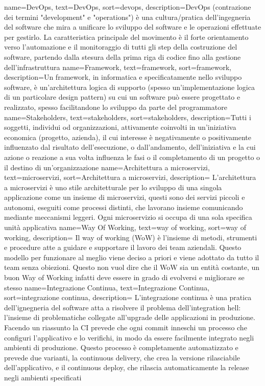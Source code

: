 {
	name=DevOps,
	text=DevOps,
	sort=devops,
	description={DevOps (contrazione dei termini "development" e "operations") è una cultura/pratica dell'ingegneria del software che mira a unificare lo sviluppo del software e le operazioni effettuate per gestirlo. La caratteristica principale del movimento è il forte orientamento verso l'automazione e il monitoraggio di tutti gli step della costruzione del software, partendo dalla stesura della prima riga di codice fino alla gestione dell'infrastruttura}
}
{
	name=Framework,
	text=framework,
	sort=framework,
	description={Un framework, in informatica e specificatamente nello sviluppo software, è un'architettura logica di supporto (spesso un'implementazione logica di un particolare design pattern) su cui un software può essere progettato e realizzato, spesso facilitandone lo sviluppo da parte del programmatore}
}
{
	name=Stakeholders,
	text=stakeholders,
	sort=stakeholders,
	description={Tutti i soggetti, individui od organizzazioni, attivamente coinvolti in un’iniziativa economica (progetto, azienda), il cui interesse è negativamente o positivamente influenzato dal risultato dell’esecuzione, o dall’andamento, dell’iniziativa e la cui azione o reazione a sua volta influenza le fasi o il completamento di un progetto o il destino di un’organizzazione}
}
{
	name=Architettura a microservizi,
	text=microservizi,
	sort=Architettura a microservizi,
	description={ L'architettura a microservizi è uno stile architetturale per lo sviluppo di una singola applicazione come un insieme di microservizi, questi sono dei servizi piccoli e autonomi, eseguiti come	processi distinti, che lavorano insieme comunicando mediante meccanismi leggeri. Ogni microservizio si occupa di una sola specifica unità applicativa}
}
{
	name=Way Of Working,
	text=way of working,
	sort=way of working,
	description={ Il way of working (WoW) è l'insieme di metodi, strumenti e procedure atte a guidare e supportare il lavoro dei team aziendali. Questo modello per funzionare al meglio viene deciso a priori e viene adottato da tutto il team senza obiezioni. Questo non vuol dire che il WoW sia un entità costante, un buon Way of Working infatti deve essere in grado di evolversi e migliorare se stesso}
}
{
	name=Integrazione Continua,
	text=Integrazione Continua,
	sort=integrazione continua,
	description={ L'integrazione continua è una pratica dell'ignegneria del software atta a risolvere il problema dell'integration hell: l'insieme di problematiche collegate all'upgrade delle applicazioni in produzione. Facendo un riassunto la CI prevede che ogni commit inneschi un processo che configuri l'applicativo e lo verifichi, in modo da essere facilmente integrato negli ambienti di produzione. Questo processo è completamente automatizzato e prevede due varianti, la continuous delivery, che crea la versione rilasciabile dell'applicativo, e il continuous deploy, che rilascia automaticamente la release negli ambienti specificati}
}
